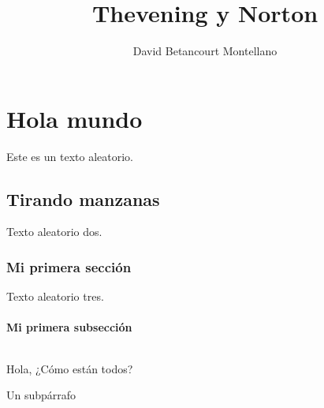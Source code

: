 \documentclass[11pt,a4paper]{report}
\author{David Betancourt Montellano}
\title{Thevening y Norton}
\begin{document}
\maketitle %
\part{Hola mundo}
	Este es un texto aleatorio.
	\chapter{Tirando manzanas}
		Texto aleatorio dos.
		\section{Mi primera sección}
			Texto aleatorio tres.
			\subsection{Mi primera subsección}
			\begin{multicols}{2}
				\paragraph{}
					Hola, ¿Cómo están todos?
					\subparagraph{}
						Un subpárrafo
			\end{multicols}
				
			
\end{document}
